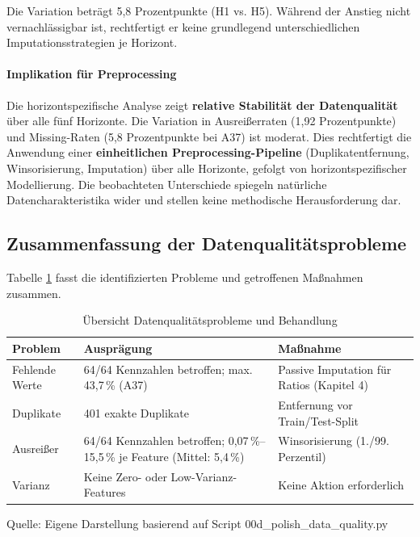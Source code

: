 Die Variation beträgt 5,8 Prozentpunkte (H1 vs. H5). Während der Anstieg nicht vernachlässigbar ist, rechtfertigt er keine grundlegend unterschiedlichen Imputationsstrategien je Horizont.

\paragraph{Implikation für Preprocessing}

Die horizontspezifische Analyse zeigt \textbf{relative Stabilität der Datenqualität} über alle fünf Horizonte. Die Variation in Ausreißerraten (1,92 Prozentpunkte) und Missing-Raten (5,8 Prozentpunkte bei A37) ist moderat. Dies rechtfertigt die Anwendung einer \textbf{einheitlichen Preprocessing-Pipeline} (Duplikatentfernung, Winsorisierung, Imputation) über alle Horizonte, gefolgt von horizontspezifischer Modellierung. Die beobachteten Unterschiede spiegeln natürliche Datencharakteristika wider und stellen keine methodische Herausforderung dar.

\subsection{Zusammenfassung der Datenqualitätsprobleme}

Tabelle \ref{tab:datenqualitaet_summary} fasst die identifizierten Probleme und getroffenen Maßnahmen zusammen.

\begin{table}[htbp]
\centering
\caption{Übersicht Datenqualitätsprobleme und Behandlung}
\label{tab:datenqualitaet_summary}
\begin{tabular}{lp{5cm}p{5cm}}
\toprule
\textbf{Problem} & \textbf{Ausprägung} & \textbf{Maßnahme} \\
\midrule
Fehlende Werte & 64/64 Kennzahlen betroffen; max. 43,7\,\% (A37) & Passive Imputation für Ratios (Kapitel 4) \\
\midrule
Duplikate & 401 exakte Duplikate & Entfernung vor Train/Test-Split \\
\midrule
Ausreißer & 64/64 Kennzahlen betroffen; 0,07\,\%--15,5\,\% je Feature (Mittel: 5,4\,\%) & Winsorisierung (1./99. Perzentil) \\
\midrule
Varianz & Keine Zero- oder Low-Varianz-Features & Keine Aktion erforderlich \\
\bottomrule
\end{tabular}
\par\smallskip
{\footnotesize Quelle: Eigene Darstellung basierend auf Script 00d\_polish\_data\_quality.py}
\end{table}

